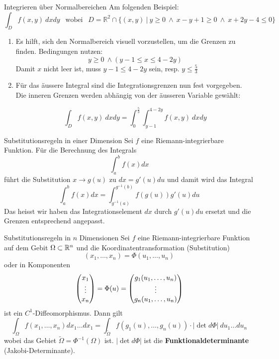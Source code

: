 \begin{Rezept}{Integrieren über Normalbereichen}{}
Am folgenden Beispiel:
\[ \int_D f(x, y) ~ dx dy ~~ \text{ wobei } ~~ D = \mathbb{R}^2 \cap \{(x, y) ~ | ~ y \geq 0 ~ \wedge ~ x-y+1\geq 0 ~ \wedge ~ x+2y-4 \leq 0\}\]
\begin{enumerate}
\item {
Es hilft, sich den Normalbereich visuell vorzustellen, um die Grenzen
zu finden. Bedingungen nutzen:
\[ y \geq 0 ~ \wedge (y-1 \leq x \leq 4-2y) \]
Damit $x$ nicht leer ist, muss $y-1 \leq 4-2y$ sein, resp. $y \leq \frac{5}{3}$ 
}
\item {
Für das äussere Integral sind die Integrationsgrenzen nun fest vorgegeben. Die inneren Grenzen
werden abhängig von der äusseren Variable gewählt:

\[ \int_D f(x,y) ~ dx dy = \int_0^{\frac{5}{3}} \int_{y-1}^{4-2y} f(x,y) ~ dx dy \]

}
\end{enumerate}
\end{Rezept}


\begin{Satz}{Substitutionsregeln in einer Dimension}{}
    Sei $f$ eine Riemann-integrierbare Funktion. Für die Berechnung des Integrals
    \[
        \int_a^b f(x) dx
    \]
    führt die Substitution $x \to g(u)$ zu $dx = g'(u)du$ und damit wird das Integral
    \[
        \int_a^b f(x) dx = \int_{g^{-1}(a)}^{g^{-1}(b)} f(g(u)) g'(u) du
    \]
    Das heisst wir haben das Integrationselement $dx$ durch $g'(u)du$ ersetzt und die Grenzen entsprechend angepasst.
\end{Satz}

\begin{Satz}{Substitutionsregeln in $n$ Dimensionen}{}
    Sei $f$ eine Riemann-integrierbare Funktion auf dem Gebit $\Omega \subset \mathbb{R}^n$ und die Koordinatentransformation (Substitution)
    \[
    (x_1,\hdots,x_n) = \Phi(u_1, \hdots,  u_n)
    \]
    oder in Komponenten
    \[
        \begin{pmatrix} x_1 \\ \vdots \\ x_n \end{pmatrix}
        = \Phi(u)
        = \begin{pmatrix} g_1(u_1,\hdots,u_n) \\ \vdots \\ g_n(u_1,\hdots,u_n) \end{pmatrix}
    \]
    ist ein $C^1$-Diffeomorphismus. Dann gilt
    \[
        \int_\Omega f(x_1, \hdots, x_n)dx_1\hdots dx_1 = \int_{\widetilde{\Omega}} f(g_1(u), \hdots, g_n(u)) \cdot |\det d \Phi|\ du_1\hdots du_n
    \]
    wobei das Gebiet $\widetilde{\Omega} = \Phi^{-1}(\Omega)$ ist. $|\det d\Phi|$ ist die \textbf{Funktionaldeterminante} (Jakobi-Determinante).
\end{Satz}

